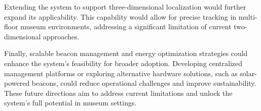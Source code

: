 Extending the system to support three-dimensional localization would further expand its applicability. This capability would allow for precise tracking in multi-floor museum environments, addressing a significant limitation of current two-dimensional approaches.

Finally, scalable beacon management and energy optimization strategies could enhance the system’s feasibility for broader adoption. Developing centralized management platforms or exploring alternative hardware solutions, such as solar-powered beacons, could reduce operational challenges and improve sustainability. These future directions aim to address current limitations and unlock the system’s full potential in museum settings.